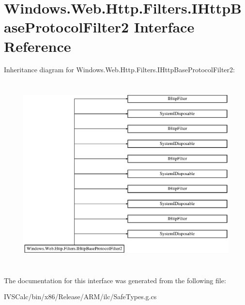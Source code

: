 \hypertarget{interface_windows_1_1_web_1_1_http_1_1_filters_1_1_i_http_base_protocol_filter2}{}\section{Windows.\+Web.\+Http.\+Filters.\+I\+Http\+Base\+Protocol\+Filter2 Interface Reference}
\label{interface_windows_1_1_web_1_1_http_1_1_filters_1_1_i_http_base_protocol_filter2}
Inheritance diagram for Windows.\+Web.\+Http.\+Filters.\+I\+Http\+Base\+Protocol\+Filter2\+:\begin{figure}[H]
\begin{center}
\leavevmode
\includegraphics[height=10.131579cm]{interface_windows_1_1_web_1_1_http_1_1_filters_1_1_i_http_base_protocol_filter2}
\end{center}
\end{figure}


The documentation for this interface was generated from the following file\+:\begin{DoxyCompactItemize}
\item 
I\+V\+S\+Calc/bin/x86/\+Release/\+A\+R\+M/ilc/Safe\+Types.\+g.\+cs\end{DoxyCompactItemize}
